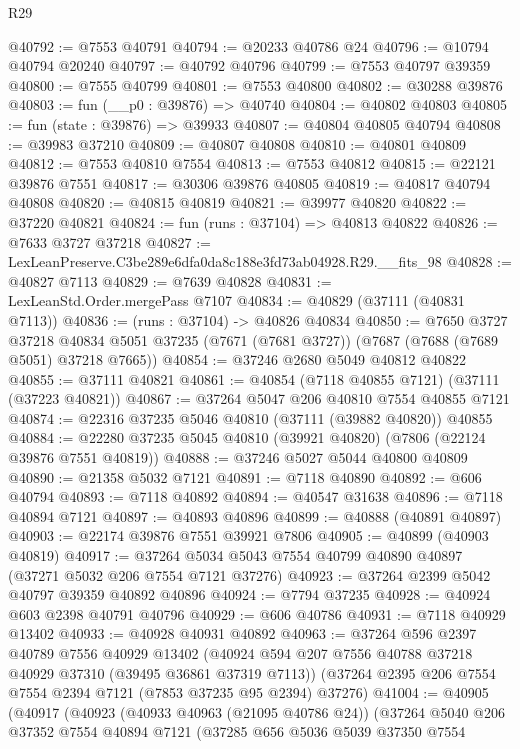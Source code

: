 \begin{lexlean}{R29}
\begin{coremodule}
@40792 := @7553 @40791
@40794 := @20233 @40786 @24
@40796 := @10794 @40794 @20240
@40797 := @40792 @40796
@40799 := @7553 @40797 @39359
@40800 := @7555 @40799
@40801 := @7553 @40800
@40802 := @30288 @39876
@40803 := fun (__p0 : @39876) => @40740
@40804 := @40802 @40803
@40805 := fun (state : @39876) => @39933
@40807 := @40804 @40805 @40794
@40808 := @39983 @37210
@40809 := @40807 @40808
@40810 := @40801 @40809
@40812 := @7553 @40810 @7554
@40813 := @7553 @40812
@40815 := @22121 @39876 @7551
@40817 := @30306 @39876 @40805
@40819 := @40817 @40794 @40808
@40820 := @40815 @40819
@40821 := @39977 @40820
@40822 := @37220 @40821
@40824 := fun (runs : @37104) => @40813 @40822
@40826 := @7633 @3727 @37218
@40827 := LexLeanPreserve.C3be289e6dfa0da8c188e3fd73ab04928.R29.__fits_98
@40828 := @40827 @7113
@40829 := @7639 @40828
@40831 := LexLeanStd.Order.mergePass @7107
@40834 := @40829 (@37111 (@40831 @7113))
@40836 := (runs : @37104) -> @40826 @40834
@40850 := @7650
    @3727
    @37218
    @40834
    @5051
    @37235
    (@7671 (@7681 @3727))
    (@7687 (@7688 (@7689 @5051) @37218 @7665))
@40854 := @37246 @2680 @5049 @40812 @40822
@40855 := @37111 @40821
@40861 := @40854 (@7118 @40855 @7121) (@37111 (@37223 @40821))
@40867 := @37264 @5047 @206 @40810 @7554 @40855 @7121
@40874 := @22316 @37235 @5046 @40810 (@37111 (@39882 @40820)) @40855
@40884 := @22280 @37235 @5045 @40810 (@39921 @40820) (@7806 (@22124 @39876 @7551 @40819))
@40888 := @37246 @5027 @5044 @40800 @40809
@40890 := @21358 @5032 @7121
@40891 := @7118 @40890
@40892 := @606 @40794
@40893 := @7118 @40892
@40894 := @40547 @31638
@40896 := @7118 @40894 @7121
@40897 := @40893 @40896
@40899 := @40888 (@40891 @40897)
@40903 := @22174 @39876 @7551 @39921 @7806
@40905 := @40899 (@40903 @40819)
@40917 := @37264 @5034 @5043 @7554 @40799 @40890 @40897 (@37271 @5032 @206 @7554 @7121 @37276)
@40923 := @37264 @2399 @5042 @40797 @39359 @40892 @40896
@40924 := @7794 @37235
@40928 := @40924 @603 @2398 @40791 @40796
@40929 := @606 @40786
@40931 := @7118 @40929 @13402
@40933 := @40928 @40931 @40892
@40963 := @37264
    @596
    @2397
    @40789
    @7556
    @40929
    @13402
    (@40924 @594 @207 @7556 @40788 @37218 @40929 @37310 (@39495 @36861 @37319 @7113))
    (@37264 @2395 @206 @7554 @7554 @2394 @7121 (@7853 @37235 @95 @2394) @37276)
@41004 := @40905
    (@40917
      (@40923
        (@40933 @40963 (@21095 @40786 @24))
        (@37264
          @5040
          @206
          @37352
          @7554
          @40894
          @7121
          (@37285
            @656
            @5036
            @5039
            @37350
            @7554

\end{coremodule}
\end{lexlean}
